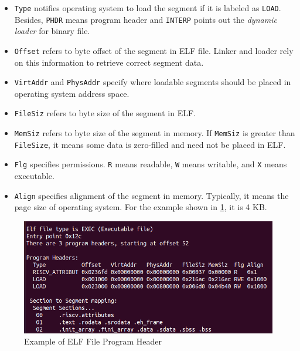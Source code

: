 \begin{itemize}
    \item \texttt{Type} notifies operating system to load the segment if it is labeled as \texttt{LOAD}. Besides, \texttt{PHDR} means program header and \texttt{INTERP} points out the \textit{dynamic loader} for binary file.
    
    \item \texttt{Offset} refers to byte offset of the segment in \ac{ELF} file. Linker and loader rely on this information to retrieve correct segment data.
    
    \item \texttt{VirtAddr} and \texttt{PhysAddr} specify where loadable segments should be placed in operating system address space.
    
    \item \texttt{FileSiz} refers to byte size of the segment in \ac{ELF}.
    
    \item \texttt{MemSiz} refers to byte size of the segment in memory. If \texttt{MemSiz} is greater than \texttt{FileSize}, it means some data is zero-filled and need not be placed in \ac{ELF}.

    \item \texttt{Flg} specifies permissions. \texttt{R} means readable, \texttt{W} means writable, and \texttt{X} means executable.
    
    \item \texttt{Align} specifies alignment of the segment in memory. Typically, it means the page size of operating system. For the example shown in \cref{fig:elf_program_headers_example}, it is 4 KB. 
\end{itemize}

\begin{figure}
    \centering
    \includegraphics[width=.85\linewidth]{figures/ELF_program_header.png}
    \caption{Example of \ac{ELF} File Program Header}
    \label{fig:elf_program_headers_example}
\end{figure}

